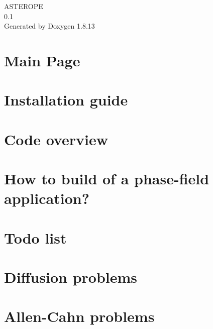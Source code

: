 \documentclass[twoside]{book}
\newcommand{\+}{\discretionary{\mbox{\scriptsize$\hookleftarrow$}}{}{}}
\newcommand{\clearemptydoublepage}{%
  \newpage{\pagestyle{empty}\cleardoublepage}%
}
\begin{document}
\hypersetup{pageanchor=false,
             bookmarksnumbered=true,
             pdfencoding=unicode
            }
\begin{titlepage}
\vspace*{7cm}
\begin{center}%
{\Large A\+S\+T\+E\+R\+O\+PE \\[1ex]\large 0.\+1 }\\
\vspace*{1cm}
{\large Generated by Doxygen 1.8.13}\\
\end{center}
\end{titlepage}
\clearemptydoublepage
{}
\tableofcontents
\clearemptydoublepage
{}
\hypersetup{pageanchor=true}

\chapter{Main Page}
\label{index}\hypertarget{index}{}
\chapter{Installation guide}
\label{__install}

\chapter{Code overview}
\label{__overview}

\chapter{How to build of a phase-\/field application?}
\label{__howto}

\chapter{Todo list}
\label{__todo}

\chapter{Diffusion problems}
\label{__diffusion}

\chapter{Allen-\/\+Cahn problems}
\label{__allencahn}

\end{document}
